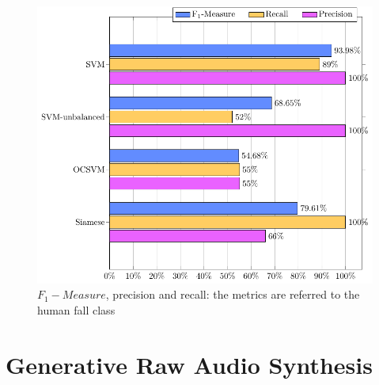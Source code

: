 \begin{figure}[h]
	\centering
	\includegraphics[width=0.7\linewidth]{img/results_f1}
	\caption[Siamese Nets for human-fall detection - Results]{$F_1 -Measure$, precision and recall: the metrics are referred to the human fall class}
	\label{fig:results_f1}
\end{figure}

\newpage
\section{Generative Raw Audio Synthesis}
